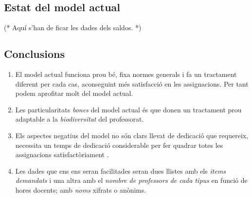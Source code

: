 \documentclass[10pt]{proc}
\newcommand{\nehh}[1]{\color{magenta} (* {#1} *) \normalcolor }
\begin{document}
\subsection{Estat del model actual}
\nehh{Aquí s'han de ficar les dades dels saldos.}
\subsection{Conclusions}
		\begin{enumerate}
			\item El model actual funciona prou bé, fixa normes generals i fa un tractament diferent per cada cas, aconseguint més satisfacció en les assignacions. Per tant podem aprofitar molt del model actual. 
			\item Les particularitats \textit{bones} del model actual és que donen un tractament prou adaptable a la \textit{biodiversitat} del professorat.
			\item Els aspectes negatius del model no són clars llevat de dedicació que requereix, necessita un temps de dedicació considerable per fer quadrar totes les assignacions satisfactòriament .
			\item Les dades que ens ens seran facilitades seran dues llistes amb els \textit{items demandats} i una altra amb el \textit{nombre de professors de cada tipus} en funció de hores docents; amb \textit{noms} xifrats o anònims.
		\end{enumerate}
\end{document}
